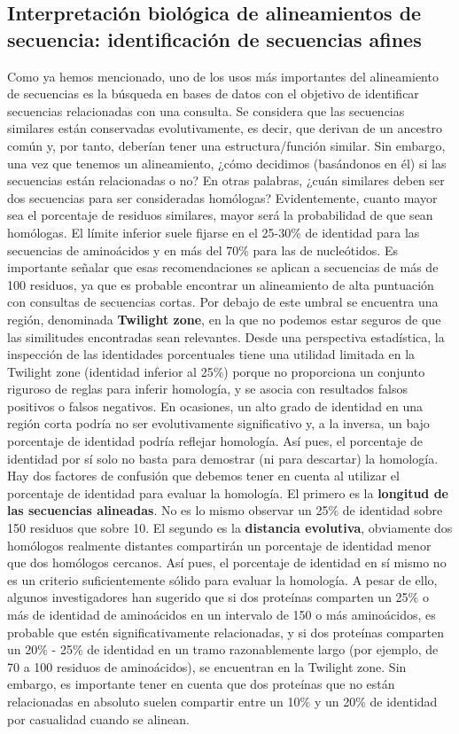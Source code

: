 \subsection{Interpretación biológica de alineamientos de secuencia: identificación de secuencias afines}
Como ya hemos mencionado, uno de los usos más importantes del alineamiento de secuencias es la búsqueda en bases de datos con el objetivo de identificar secuencias relacionadas con una consulta. Se considera que las secuencias similares están conservadas evolutivamente, es decir, que derivan de un ancestro común y, por tanto, deberían tener una estructura/función similar. Sin embargo, una vez que tenemos un alineamiento, ¿cómo decidimos (basándonos en él) si las secuencias están relacionadas o no? En otras palabras, ¿cuán similares deben ser dos secuencias para ser consideradas homólogas? Evidentemente, cuanto mayor sea el porcentaje de residuos similares, mayor será la probabilidad de que sean homólogas. El límite inferior suele fijarse en el 25-30\% de identidad para las secuencias de aminoácidos y en más del 70\% para las de nucleótidos. Es importante señalar que esas recomendaciones se aplican a secuencias de más de 100 residuos, ya que es probable encontrar un alineamiento de alta puntuación con consultas de secuencias cortas. Por debajo de este umbral se encuentra una región, denominada \textbf{Twilight zone}, en la que no podemos estar seguros de que las similitudes encontradas sean relevantes. Desde una perspectiva estadística, la inspección de las identidades porcentuales tiene una utilidad limitada en la Twilight zone (identidad inferior al 25\%) porque no proporciona un conjunto riguroso de reglas para inferir homología, y se asocia con resultados falsos positivos o falsos negativos. En ocasiones, un alto grado de identidad en una región corta podría no ser evolutivamente significativo y, a la inversa, un bajo porcentaje de identidad podría reflejar homología. Así pues, el porcentaje de identidad por sí solo no basta para demostrar (ni para descartar) la homología. Hay dos factores de confusión que debemos tener en cuenta al utilizar el porcentaje de identidad para evaluar la homología. El primero es la \textbf{longitud de las secuencias alineadas}. No es lo mismo observar un 25\% de identidad sobre 150 residuos que sobre 10. El segundo es la \textbf{distancia evolutiva}, obviamente dos homólogos realmente distantes compartirán un porcentaje de identidad menor que dos homólogos cercanos. Así pues, el porcentaje de identidad en sí mismo no es un criterio suficientemente sólido para evaluar la homología. A pesar de ello, algunos investigadores han sugerido que si dos proteínas comparten un 25\% o más de identidad de aminoácidos en un intervalo de 150 o más aminoácidos, es probable que estén significativamente relacionadas, y si dos proteínas comparten un 20\% - 25\% de identidad en un tramo razonablemente largo (por ejemplo, de 70 a 100 residuos de aminoácidos), se encuentran en la Twilight zone. Sin embargo, es importante tener en cuenta que dos proteínas que no están relacionadas en absoluto suelen compartir entre un 10\% y un 20\% de identidad por casualidad cuando se alinean.

